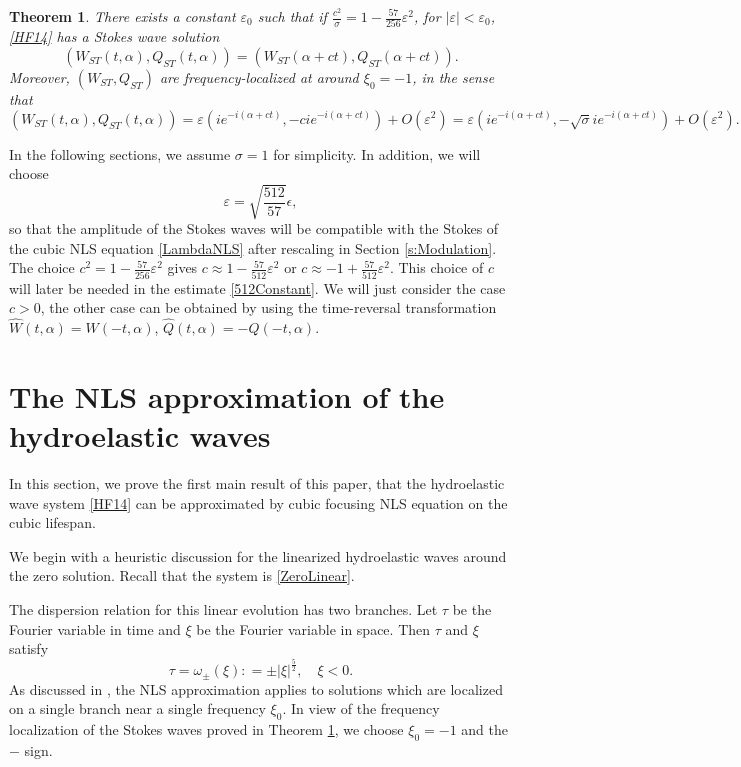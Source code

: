 \documentclass[12pt]{amsart}
\newtheorem{theorem}{Theorem}[section]
\theoremstyle{remark}
\theoremstyle{definition}
\numberwithin{equation}{section}
\newcommand{\al}{\alpha}
\begin{document}
\begin{theorem} \label{t:Existence}
There exists a constant $\varepsilon_0$ such that if $\frac{c^2}{\sigma} = 1 -\frac{57}{256}\varepsilon^2$, for $ |\varepsilon| < \varepsilon_0$, \eqref{HF14} has a Stokes wave solution
\begin{equation*}
  (W_{ST}(t,\al), Q_{ST}(t, \al)) = (W_{ST}(\al+ ct), Q_{ST}(\al + ct)).
\end{equation*}
Moreover, $(W_{ST}, Q_{ST})$ are frequency-localized at around $\xi_0 =-1$, in the sense that
\begin{equation*}
    (W_{ST}(t,\al), Q_{ST}(t,\al)) = \varepsilon (ie^{-i(\al+ ct)}, -cie^{-i(\al+ ct)}) + O(\varepsilon^2) = \varepsilon (ie^{-i(\al+ ct)}, -\sqrt{\sigma}ie^{-i(\al+ ct)}) + O(\varepsilon^2).
\end{equation*}
\end{theorem}
In the following sections, we assume $\sigma = 1$ for simplicity.
In addition, we will choose
\begin{equation*}
    \varepsilon = \sqrt{\frac{512}{57}}\epsilon,
\end{equation*}
so that the amplitude of the Stokes waves will be compatible with the Stokes of the cubic NLS equation \eqref{LambdaNLS} after rescaling in Section \ref{s:Modulation}.
The choice $c^2 = 1 -\frac{57}{256}\varepsilon^2$ gives $c \approx 1 -\frac{57}{512}\varepsilon^2$ or $c\approx -1 + \frac{57}{512}\varepsilon^2$.
This choice of $c$ will later be needed in the estimate \eqref{512Constant}.
We will just consider the case $c>0$, the other case can be obtained by using the time-reversal transformation $\hat{W}(t,\al)=W(-t,\al)$, $\hat{Q}(t,\al)=-Q(-t,\al)$.

\section{The NLS approximation of the hydroelastic waves} \label{s:Approximation}
In this section, we prove the first main result of this paper, that the hydroelastic wave system \eqref{HF14} can be approximated by cubic focusing NLS equation on the cubic lifespan.

We begin with a heuristic discussion for the linearized hydroelastic waves around the zero solution.
Recall that the system is \eqref{ZeroLinear}.

The dispersion relation for this linear evolution has two branches. 
Let $\tau$ be the Fourier variable in time and $\xi$ be the Fourier variable in space.
Then $\tau$ and $\xi$ satisfy 
\begin{equation*}
 \tau = \omega_{\pm}(\xi) : = \pm |\xi|^{\frac{5}{2}}, \quad \xi <0.
\end{equation*}
As discussed in \cite{ifrim2019nls}, the NLS approximation
applies to solutions which are localized on a single branch near a single frequency $\xi_0$.
In view of the frequency localization of the Stokes waves proved in Theorem \ref{t:Existence}, we choose $\xi_0 = -1$ and the $-$ sign.
\end{document}
